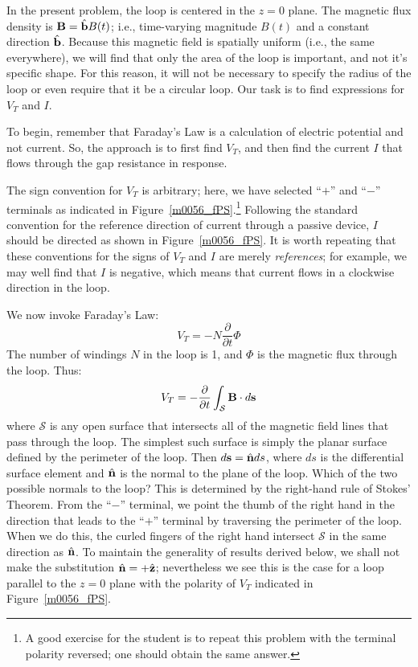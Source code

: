 In the present problem, the loop is centered in the $z=0$ plane.
The magnetic flux density is ${\bf B} = \hat{\bf b}B(t)$; i.e., time-varying magnitude $B(t)$ and a constant direction $\hat{\bf b}$.
Because this magnetic field is spatially uniform (i.e., the same everywhere), we will find that only the area of the loop is important, and not it's specific shape.
For this reason, it will not be necessary to specify the radius of the loop or even require that it be a circular loop. 
Our task is to find expressions for $V_T$ and $I$.

To begin, remember that Faraday's Law is a calculation of electric potential and not current.
So, the approach is to first find $V_T$, and then find the current $I$ that flows through the gap resistance in response.
  
The sign convention for $V_T$ is arbitrary; here, we have selected ``$+$'' and ``$-$'' terminals as indicated in Figure~\ref{m0056_fPS}.\footnote{A good exercise for the student is to repeat this problem with the terminal polarity reversed; one should obtain the same answer.}
Following the standard convention for the reference direction of current through a passive device, $I$ should be directed as shown in Figure~\ref{m0056_fPS}.
It is worth repeating that these conventions for the signs of $V_T$ and $I$ are merely \emph{references}; for example, we may well find that $I$ is negative, which means that current flows in a clockwise direction in the loop. 

We now invoke Faraday's Law:
%
\begin{equation}   
V_T = - N \frac{\partial}{\partial t} \Phi 
\end{equation}
%
The number of windings $N$ in the loop is 1, and $\Phi$ is the magnetic flux through the loop.  Thus:
%
\begin{equation}   
V_T = - \frac{\partial}{\partial t} \int_{\mathcal{S}} { {\bf B} \cdot d{\bf s} }
\end{equation}
%
where $\mathcal{S}$ is any open surface that intersects all of the magnetic field lines that pass through the loop.
The simplest such surface is simply the planar surface defined by the perimeter of the loop.
Then $d{\bf s}=\hat{\bf n}ds$, where $ds$ is the differential surface element and $\hat{\bf n}$ is the normal to the plane of the loop.
Which of the two possible normals to the loop?
This is determined by the right-hand rule 
of Stokes' Theorem.
From the ``$-$'' terminal, we point the thumb of the right hand in the direction that leads to the ``$+$'' terminal by traversing the perimeter of the loop.
When we do this, the curled fingers of the right hand intersect $\mathcal{S}$ in the same direction as $\hat{\bf n}$.
To maintain the generality of results derived below, we shall not make the substitution $\hat{\bf n}=+\hat{\bf z}$; nevertheless we see this is the case for a loop parallel to the $z=0$ plane with the polarity of $V_T$ indicated in Figure~\ref{m0056_fPS}.

